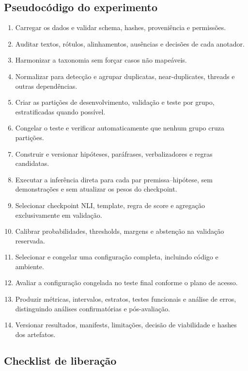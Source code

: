 \subsection{Pseudocódigo do experimento}

\begin{enumerate}
\item Carregar os dados e validar schema, hashes, proveniência e permissões.
\item Auditar textos, rótulos, alinhamentos, ausências e decisões de cada anotador.
\item Harmonizar a taxonomia sem forçar casos não mapeáveis.
\item Normalizar para detecção e agrupar duplicatas, near-duplicates, threads e outras dependências.
\item Criar as partições de desenvolvimento, validação e teste por grupo, estratificadas quando possível.
\item Congelar o teste e verificar automaticamente que nenhum grupo cruza partições.
\item Construir e versionar hipóteses, paráfrases, verbalizadores e regras candidatas.
\item Executar a inferência direta para cada par premissa--hipótese, sem demonstrações e sem atualizar os pesos do checkpoint.
\item Selecionar checkpoint NLI, template, regra de score e agregação exclusivamente em validação.
\item Calibrar probabilidades, thresholds, margens e abstenção na validação reservada.
\item Selecionar e congelar uma configuração completa, incluindo código e ambiente.
\item Avaliar a configuração congelada no teste final conforme o plano de acesso.
\item Produzir métricas, intervalos, estratos, testes funcionais e análise de erros, distinguindo análises confirmatórias e pós-avaliação.
\item Versionar resultados, manifests, limitações, decisão de viabilidade e hashes dos artefatos.
\end{enumerate}

\subsection{Checklist de liberação}

\providecommand{\checkempty}{\fbox{\rule{0pt}{1.1ex}\rule{1.1ex}{0pt}}}

